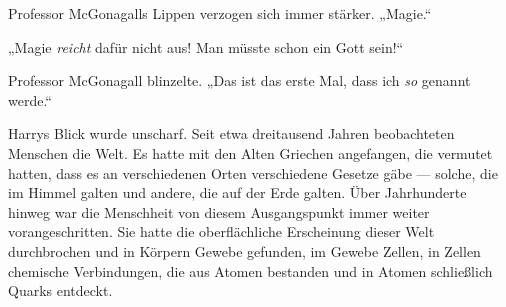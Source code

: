 Professor McGonagalls Lippen verzogen sich immer stärker.
„Magie.“

„Magie \emph{reicht} dafür nicht aus! Man müsste schon ein Gott sein!“

Professor McGonagall blinzelte.
„Das ist das erste Mal, dass ich \emph{so} genannt werde.“


Harrys Blick wurde unscharf. Seit etwa dreitausend Jahren beobachteten Menschen die Welt. Es hatte mit den Alten Griechen angefangen, die vermutet hatten, dass es an verschiedenen Orten verschiedene Gesetze gäbe — solche, die im Himmel galten und andere, die auf der Erde galten. Über Jahrhunderte hinweg war die Menschheit von diesem Ausgangspunkt immer weiter vorangeschritten. Sie hatte die oberflächliche Erscheinung dieser Welt durchbrochen und in Körpern Gewebe gefunden, im Gewebe Zellen, in Zellen chemische Verbindungen, die aus Atomen bestanden und in Atomen schließlich Quarks entdeckt.

